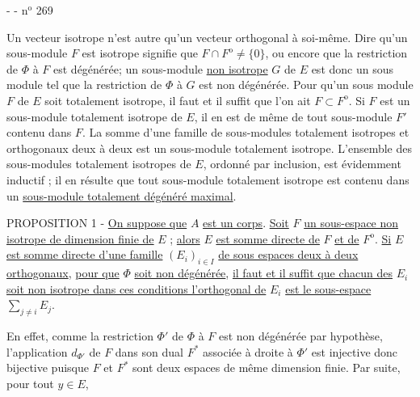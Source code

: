 -  - \hfill n$^{\mathrm{o}}$ 269

Un vecteur isotrope n'est autre qu'un vecteur orthogonal à soi-même. Dire qu'un sous-module $F$ est isotrope signifie que $F\cap F^{\mathrm o}\ne\{0\}$, ou encore que la restriction de $\Phi$ à $F$ est dégénérée; un sous-module \uline{non isotrope} $G$ de $E$ est donc un sous module tel que la restriction de $\Phi$ à $G$ est non dégénérée. Pour qu'un sous module $F$ de $E$ soit totalement isotrope, il faut et il suffit que l'on ait $F\subset F^{\mathrm o}$. Si $F$ est un sous-module totalement isotrope de $E$, il en est de même de tout sous-module $F'$ contenu dans $F$. La somme d'une famille de sous-modules totalement isotropes et orthogonaux deux à deux est un sous-module totalement isotrope.
L'ensemble des sous-modules totalement isotropes de $E$, ordonné par inclusion, est évidemment inductif ; il en résulte que tout sous-module totalement isotrope est contenu dans un \uline{sous-module totalement dégénéré maximal}.

PROPOSITION 1 - \uline{On suppose que} $A$ \uline{est un corps}. \uline{Soit} $F$ \uline{un sous-espace non isotrope de dimension finie de} $E$ ; \uline{alors} $E$ \uline{est somme directe de} $F$ \uline{et de} $F^{\mathrm o}$. \uline{Si} $E$ \uline{est somme directe d'une famille} $(E_i)_{i\in I}$ \uline{de sous espaces deux à deux orthogonaux}, \uline{pour que} $\Phi$ \uline{soit non dégénérée}, \uline{il faut et il suffit que chacun des} $E_i$ \uline{soit non isotrope dans ces conditions l'orthogonal de} $E_i$ \uline{est le sous-espace} $\sum_{j\ne i}E_j$.

En effet, comme la restriction $\Phi'$ de $\Phi$ à $F$ est non dégénérée par hypothèse, l'application $d_{\Phi'}$ de $F$ dans son dual $F^*$ associée à droite à $\Phi'$ est injective donc bijective puisque $F$ et $F^*$ sont deux espaces de même dimension finie. Par suite, pour tout $y\in E$,

